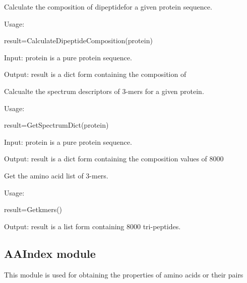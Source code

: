 \documentclass[letterpaper,10pt,english]{sphinxmanual}
\begin{document}

\begin{fulllineitems}
\label{reference/AAComposition:AAComposition.CalculateDipeptideComposition}
Calculate the composition of dipeptidefor a given protein sequence.

Usage:

result=CalculateDipeptideComposition(protein)

Input: protein is a pure protein sequence.

Output: result is a dict form containing the composition of

\end{fulllineitems}


\begin{fulllineitems}
\label{reference/AAComposition:AAComposition.GetSpectrumDict}
Calcualte the spectrum descriptors of 3-mers for a given protein.

Usage:

result=GetSpectrumDict(protein)

Input: protein is a pure protein sequence.

Output: result is a dict form containing the composition values of 8000

\end{fulllineitems}


\begin{fulllineitems}
\label{reference/AAComposition:AAComposition.Getkmers}
Get the amino acid list of 3-mers.

Usage:

result=Getkmers()

Output: result is a list form containing 8000 tri-peptides.

\end{fulllineitems}



\subsection{AAIndex module}
\label{reference/AAIndex:aaindex-module}\label{reference/AAIndex:module-AAIndex}\label{reference/AAIndex::doc}
This module is used for obtaining the properties of amino acids or their pairs
\end{document}
